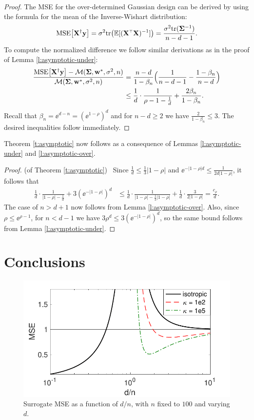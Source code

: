 \documentclass[11pt]{article}
\begin{document}
\begin{proof}
The MSE for the over-determined Gaussian design can be derived by
using the formula for the mean of the Inverse-Wishart distribution:
\begin{align*}
  \MSE{\X^\dagger\y}=\sigma^2\tr\big(\E[(\X^\top\X)^{-1}]\big) =
  \frac{\sigma^2\tr(\Sigmab^{-1}) }{n-d-1}.
\end{align*}
To compute the normalized difference we follow similar derivations as
in the proof of Lemma \ref{l:asymptotic-under}:
\begin{align*}
 \frac{{\mathrm{MSE}\big[\mathbf X^\dagger\mathbf y\big]}-\mathcal M(\mathbf{\Sigma}, \mathbf w^*,\sigma^2,n)}{\mathcal M(\mathbf{\Sigma},
    \mathbf w^*,\sigma^2,n)}
    &=  \frac {n-d}{1-\beta_n}
      \Big(\frac1{n-d-1}-\frac{1-\beta_n}{n-d}\Big)\\
  &\leq\frac1d\cdot\frac1{\rho-1-\frac1d} + \frac{2\beta_n}{1-\beta_n}.
\end{align*}
Recall that $\beta_n = \ee^{d-n} = (\ee^{1-\rho})^d$ and for $n-d\geq
2$ we have $\frac2{1-\beta_n}\leq 3$. The desired inequalities follow immediately.
\end{proof}
Theorem \ref{t:asymptotic} now follows as a consequence of
Lemmas \ref{l:asymptotic-under} and \ref{l:asymptotic-over}.
\begin{proof} (of Theorem \ref{t:asymptotic}) \
  Since $\frac1d\leq \frac13|1-\rho|$ and $\ee^{-|1-\rho|d}\leq
  \frac1{2d|1-\rho|}$, it follows that
  \begin{align*}
    \frac1d\cdot \frac{1}{|1-\rho|-\frac1d} + 3(\ee^{-|1-\rho|})^d
    &\leq \frac1d\cdot \frac{1}{|1-\rho|-\frac13|1-\rho|} +
      \frac1d\cdot\frac{3}{2|1-\rho|}=\frac {c_\rho}{d}.
  \end{align*}
  The case of $n>d+1$ now follows from Lemma
  \ref{l:asymptotic-over}. Also, since $\rho\leq \ee^{\rho-1}$, for
$n<d-1$ we have $3\rho^d\leq 3(\ee^{-|1-\rho|})^{d}$, so the same bound follows
from Lemma \ref{l:asymptotic-under}.
\end{proof}





\section{Conclusions}
\label{s:conclusions}
\begin{figure}
 \vspace{-.8cm}
 \includegraphics[width=.45\textwidth]{figs/descent-model-log}
 \vspace{-6mm}
  \caption{
Surrogate MSE as a function of $d/n$, with $n$
fixed to $100$ and varying $d$.}
  \label{f:model}
  \vspace{-3mm}
\end{figure}
\end{document}
